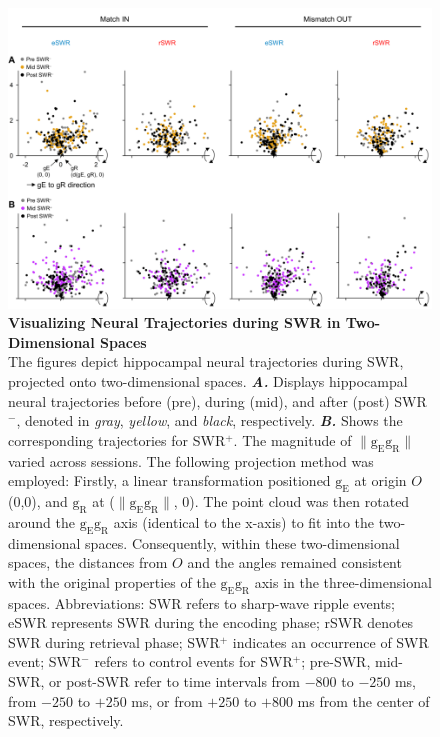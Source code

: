 \documentclass[final,3p,times,twocolumn]{elsarticle}
\begin{document}
        \begin{figure}[ht]
        	\centering
            \includegraphics[width=1\textwidth]{./src/figures/.png/Figure_ID_06.png}
        	\caption{\textbf{
Visualizing Neural Trajectories during SWR in Two-Dimensional Spaces}
\smallskip
\\
The figures depict hippocampal neural trajectories during SWR, projected onto two-dimensional spaces. \textbf{\textit{A.}} Displays hippocampal neural trajectories before (pre), during (mid), and after (post) SWR$^-$, denoted in \textit{gray}, \textit{yellow}, and \textit{black}, respectively. \textbf{\textit{B.}} Shows the corresponding trajectories for SWR$^+$. The magnitude of $\lVert \mathrm{g_{E}g_{R}} \rVert$ varied across sessions. The following projection method was employed: Firstly, a linear transformation positioned $\mathrm{g_{E}}$ at origin $O$ (0,0), and $\mathrm{g_{R}}$ at ($\lVert \mathrm{g_{E}g_{R}} \rVert$, 0). The point cloud was then rotated around the $\mathrm{g_{E}g_{R}}$ axis (identical to the x-axis) to fit into the two-dimensional spaces. Consequently, within these two-dimensional spaces, the distances from $O$ and the angles remained consistent with the original properties of the $\mathrm{g_{E}g_{R}}$ axis in the three-dimensional spaces. Abbreviations: SWR refers to sharp-wave ripple events; eSWR represents SWR during the encoding phase; rSWR denotes SWR during retrieval phase; SWR$^+$ indicates an occurrence of SWR event; SWR$^-$ refers to control events for SWR$^+$; pre-SWR, mid-SWR, or post-SWR refer to time intervals from $-800$ to $-250$ ms, from $-250$ to $+250$ ms, or from $+250$ to $+800$ ms from the center of SWR, respectively.}
        	\label{fig:06}
        \end{figure}
\end{document}

